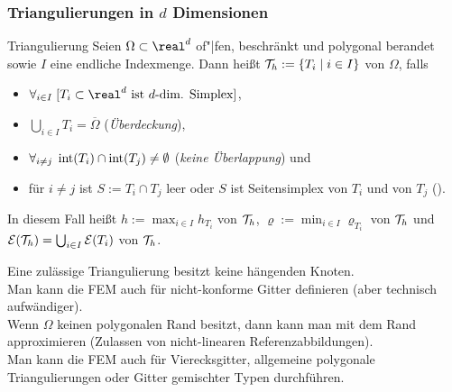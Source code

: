 \pagebreak

\subsubsection{%
    Triangulierungen in \texorpdfstring{$d$}{d} Dimensionen%
}

\begin{Def}{Triangulierung}
    Seien $\Omega \subset \real^d$ of"|fen, beschränkt und polygonal berandet sowie
    $I$ eine endliche Indexmenge.
    Dann heißt $\mathcal{T}_h := \{T_i \;|\; i \in I\}$ 
    von $\Omega$, falls
    \begin{itemize}
        \item
        $\forall_{i \in I}\; [\text{$T_i \subset \real^d$ ist $d$-dim. Simplex}]$,

        \item
        $\bigcup_{i \in I} T_i = \overline{\Omega}$
        (\emph{Überdeckung}),

        \item
        $\forall_{i \not= j}\; \operatorname{int}(T_i) \cap \operatorname{int}(T_j) \not= \emptyset$
        (\emph{keine Überlappung}) und

        \item
        für $i \not= j$ ist $S := T_i \cap T_j$
        leer oder $S$ ist Seitensimplex von $T_i$ und von $T_j$
        ().
    \end{itemize}
    In diesem Fall heißt
    $h := \max_{i \in I} h_{T_i}$  von $\mathcal{T}_h$,
    $\varrho := \min_{i \in I} \varrho_{T_i}$  von $\mathcal{T}_h$ und
    $\mathcal{E}(\mathcal{T}_h) = \bigcup_{i \in I} \mathcal{E}(T_i)$  von $\mathcal{T}_h$.
\end{Def}

\begin{Bem}
    Eine zulässige Triangulierung besitzt keine hängenden Knoten.\\
    Man kann die FEM auch für nicht-konforme Gitter definieren (aber technisch aufwändiger).\\
    Wenn $\Omega$ keinen polygonalen Rand besitzt, dann kann man mit
     dem Rand approximieren
    (Zulassen von nicht-linearen Referenzabbildungen).\\
    Man kann die FEM auch für Vierecksgitter, allgemeine polygonale Triangulierungen
    oder Gitter gemischter Typen durchführen.
\end{Bem}

